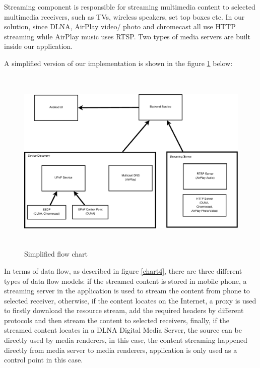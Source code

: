 Streaming component is responsible for streaming multimedia content to selected
multimedia receivers, such as TVs, wireless speakers, set top boxes etc. In our
solution, since DLNA, AirPlay video/ photo and chromecast all use HTTP streaming
while AirPlay music uses RTSP. Two types of media servers are built inside our
application. 

A simplified version of our implementation is shown in the figure \ref{chart3}
below:
\begin{figure}[htb]
\centering \includegraphics[height=9cm]{charts/chart3}
\caption{Simplified flow chart \label{chart3}}
\end{figure}

In terms of data flow, as described in figure \ref{chart4}, there are three
different types of data flow models: if the streamed content is stored in mobile
phone, a streaming server in the application is used to stream the content from
phone to selected receiver, otherwise, if the content locates on the Internet,
a proxy is used to firstly download the resource stream, add the required
headers by different protocols and then stream the content to selected
receivers, finally, if the streamed content locates in a DLNA Digital Media
Server, the source can be directly used by media renderers, in this case, the
content streaming happened directly from media server to media renderers,
application is only used as a control point in this case.

